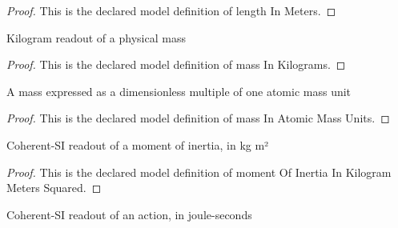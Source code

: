 \begin{proof}
  This is the declared model definition of length In Meters.
\end{proof}
\begin{definition}
  \label{def:physics:phyx-mini-0605:phyxminiproblems-problemphyxmini0605-massinkilograms}
  Kilogram readout of a physical mass
\end{definition}
\begin{proof}
  This is the declared model definition of mass In Kilograms.
\end{proof}
\begin{definition}
  \label{def:physics:phyx-mini-0605:phyxminiproblems-problemphyxmini0605-massinatomicmassunits}
  A mass expressed as a dimensionless multiple of one atomic mass unit
\end{definition}
\begin{proof}
  This is the declared model definition of mass In Atomic Mass Units.
\end{proof}
\begin{definition}
  \label{def:physics:phyx-mini-0605:phyxminiproblems-problemphyxmini0605-momentofinertiainkilogrammeterssquared}
  Coherent-SI readout of a moment of inertia, in kg m²
\end{definition}
\begin{proof}
  This is the declared model definition of moment Of Inertia In Kilogram Meters Squared.
\end{proof}
\begin{definition}
  \label{def:physics:phyx-mini-0605:phyxminiproblems-problemphyxmini0605-actioninjouleseconds}
  Coherent-SI readout of an action, in joule-seconds
\end{definition}

